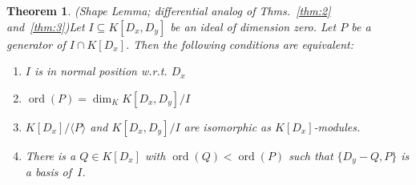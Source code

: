 \documentclass[a4paper,draft]{amsart}
\def\<#1>{\langle#1\rangle}
\def\ord{\operatorname{ord}}
\newtheorem{thm}{Theorem}
\begin{document}
\begin{thm} (Shape Lemma; differential analog of Thms.~\ref{thm:2} and~\ref{thm:3})\label{thm:our23}
  Let $I\subseteq K[D_x,D_y]$ be an ideal of dimension zero.
  Let $P$ be a generator of $I\cap K[D_x]$. Then the following conditions are equivalent:
  \begin{enumerate}
  \item $I$ is in normal position w.r.t. $D_x$
  \item $\ord(P)=\dim_K K[D_x,D_y]/I$
  \item $K[D_x]/\<P>$ and $K[D_x,D_y]/I$ are isomorphic as $K[D_x]$-modules.
  \item There is a $Q\in K[D_x]$ with $\ord(Q)<\ord(P)$ such that $\{D_y-Q,P\}$ is a basis of~$I$.
  \end{enumerate}
\end{thm}
\end{document}
